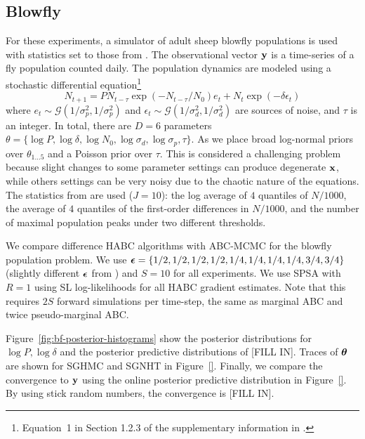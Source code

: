 \documentclass[]{article}
\begin{document}
\subsection{Blowfly}\label{sec:bf}
For these experiments, a simulator of adult sheep blowfly populations \cite{wood2010statistical} is used with statistics set to those from \cite{Meeds2014GpsUai}.  The observational vector ${\bf y}$ is a time-series of a fly population counted daily. The population dynamics are modeled using a stochastic differential equation\footnote{Equation~1 in Section 1.2.3 of the supplementary information in \cite{wood2010statistical}.}
\begin{equation}
N_{t+1} = P N_{t-\tau} \exp(-N_{t-\tau}/N_0) e_t + N_t \exp(-\delta \epsilon_t) \nonumber
\end{equation}
where $e_t \sim  \mathcal{G}( 1/{\sigma_p^2},1/{\sigma_p^2})$ and $\epsilon_t 
 \sim  \mathcal{G}( 1/{\sigma_d^2},1/{\sigma_d^2})$  
are sources of noise, and $\tau$ is an integer.  In total, there are $D=6$ parameters $\theta = \{ \log P, \log \delta, \log N_0, \log \sigma_d, \log \sigma_p, \tau\}$.  As \cite{Meeds2014GpsUai} we place broad log-normal priors over $\theta_{1\ldots 5}$ and a Poisson prior over $\tau$.  This is considered a challenging problem because slight changes to some parameter settings can produce degenerate ${\bf x}$, while others settings can be very noisy due to the chaotic nature of the equations.  The statistics from \cite{Meeds2014GpsUai} are used ($J=10$): the log average of $4$ quantiles of $N/1000$, the average of $4$ quantiles of the first-order differences in $N/1000$, and the number of maximal population peaks under two different thresholds. 

We compare difference HABC algorithms with ABC-MCMC for the blowfly population problem.  We use ${\bm {\epsilon}} = \{ 1/2,1/2,1/2,1/2, 1/4,1/4,1/4,1/4,3/4,3/4 \}$ (slightly different ${\bm {\epsilon}}$ from \cite{Meeds2014GpsUai}) and $S=10$ for all experiments.  We use SPSA with $R=1$ using SL log-likelihoods for all HABC gradient estimates.  Note that this requires $2S$ forward simulations per time-step, the same as marginal ABC and twice pseudo-marginal ABC.  

Figure~\ref{fig:bf-posterior-histograms} show the posterior distributions for $\log P, \log \delta$ and the posterior predictive distributions of [FILL IN].  Traces of ${\bm \theta}$ are shown for SGHMC and SGNHT in Figure~\ref{}.  Finally, we compare the convergence to ${\bf y}$ using the online posterior predictive distribution in Figure~\ref{}.  By using stick random numbers, the convergence is [FILL IN].
  
\end{document}
